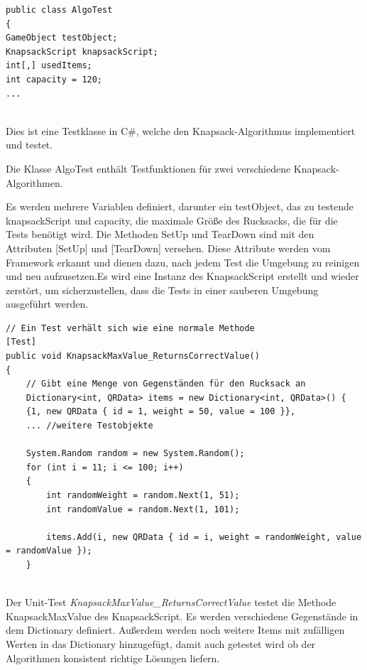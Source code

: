 \begin{lstlisting}[style=csharp, caption={Unit Test Klasse}, label=code:UnitTest]
public class AlgoTest
{
GameObject testObject;
KnapsackScript knapsackScript;
int[,] usedItems;
int capacity = 120;
...
\end{lstlisting}\\

Dies ist eine Testklasse in C#, welche den Knapsack-Algorithmus implementiert und testet.

Die Klasse AlgoTest enthält Testfunktionen für zwei verschiedene Knapsack-Algorithmen.

Es werden mehrere Variablen definiert, darunter ein testObject, das zu testende knapsackScript und capacity, die maximale
Größe des Rucksacks, die für die Tests benötigt wird. Die Methoden SetUp und TearDown sind mit den Attributen [SetUp] und
[TearDown] versehen. Diese Attribute werden vom Framework erkannt und dienen dazu, nach jedem Test die Umgebung zu reinigen
und neu aufzusetzen.Es wird eine Instanz des KnapsackScript erstellt und wieder zerstört, um sicherzustellen, dass die
Tests in einer sauberen Umgebung ausgeführt werden.

\begin{lstlisting}[style=csharp, caption={Unit Test Methode}, label=code:Test Methode]
// Ein Test verhält sich wie eine normale Methode
[Test]
public void KnapsackMaxValue_ReturnsCorrectValue()
{
    // Gibt eine Menge von Gegenständen für den Rucksack an
    Dictionary<int, QRData> items = new Dictionary<int, QRData>() {
    {1, new QRData { id = 1, weight = 50, value = 100 }},
    ... //weitere Testobjekte

    System.Random random = new System.Random();
    for (int i = 11; i <= 100; i++)
    {
        int randomWeight = random.Next(1, 51);
        int randomValue = random.Next(1, 101);

        items.Add(i, new QRData { id = i, weight = randomWeight, value = randomValue });
    }
\end{lstlisting}\\

Der Unit-Test \textit{KnapsackMaxValue_ReturnsCorrectValue} testet die Methode KnapsackMaxValue des KnapsackScript. Es werden
verschiedene Gegenstände in dem Dictionary definiert. Außerdem werden noch weitere Items mit zufälligen Werten in das
Dictionary hinzugefügt, damit auch getestet wird ob der Algorithmen konsistent richtige Lösungen liefern.

